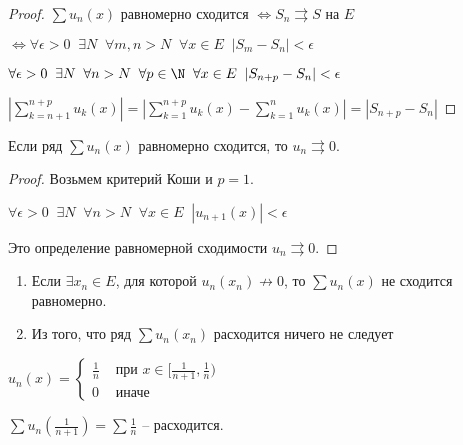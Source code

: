 \begin{proof}\slashns
	
	$\sum u_n(x)$ равномерно сходится $\iff S_n \rightrightarrows S$ на $E$
	
	$\iff \forall \epsilon > 0 \;\; \exists N \;\; \forall m,n > N \;\; \forall x \in E \;\; |S_m - S_n| < \epsilon$
	
	$\forall \epsilon > 0 \;\; \exists N \;\; \forall n > N \;\; \forall p \in \N \;\; \forall x \in E \;\; |S_{n+p} - S_n| < \epsilon$
	
	$|\sum\limits_{k = n+1}^{n+p} u_k(x)| = |\sum\limits_{k = 1}^{n+p} u_k(x) - \sum\limits_{k = 1}^{n} u_k(x)| = |S_{n+p} - S_n|$
\end{proof}

\begin{consequence}\slashns

	Если ряд $\sum u_n(x)$ равномерно сходится, то $u_n \rightrightarrows 0$.
\end{consequence}

\begin{proof}\slashns
	
	Возьмем критерий Коши и $p=1$.
	
	$\forall \epsilon > 0 \;\; \exists N \;\; \forall n > N \;\; \forall x \in E \;\; |u_{n+1}(x)| < \epsilon$
	
	Это определение равномерной сходимости $u_n \rightrightarrows 0$.
\end{proof}

\begin{remark}\slashns
	
	\begin{enumerate}
		\item
		Если $\exists x_n \in E$, для которой $u_n(x_n) \not\to 0$, то $\sum u_n(x)$ не сходится равномерно.
		\item Из того, что ряд $\sum u_n(x_n)$ расходится ничего не следует
	\end{enumerate}
\end{remark}

\begin{example}\slashns
	
	$u_n(x) = \begin{cases}
	\frac1n & \text{ при } x \in [\frac{1}{n+1}, \frac1n)\\
	0 & \text{ иначе }
	\end{cases}$
	
	$\sum u_n(\frac{1}{n+1}) = \sum \frac1n$ -- расходится.
\end{example}
